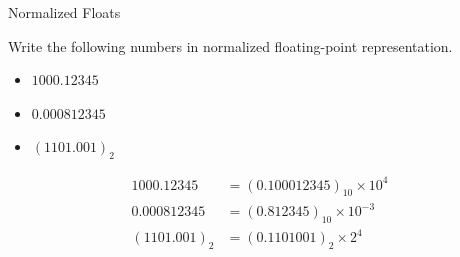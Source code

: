 \documentclass[10pt]{beamer}
\begin{document}
\begin{frame}{Normalized Floats}
\begin{example}
  Write the following numbers in normalized floating-point representation.
 
\begin{itemize}
  \item $1000.12345$
  \item $0.000812345$
  \item $(1101.001)_2$
\end{itemize}
\end{example}

\begin{align*}
  1000.12345 &= (0.100012345)_{10} \times 10^4 \\
  0.000812345 &= (0.812345)_{10} \times 10^{-3} \\
  (1101.001)_2 &= (0.1101001)_{2} \times 2^{4}
\end{align*}

\end{frame}
\end{document}
